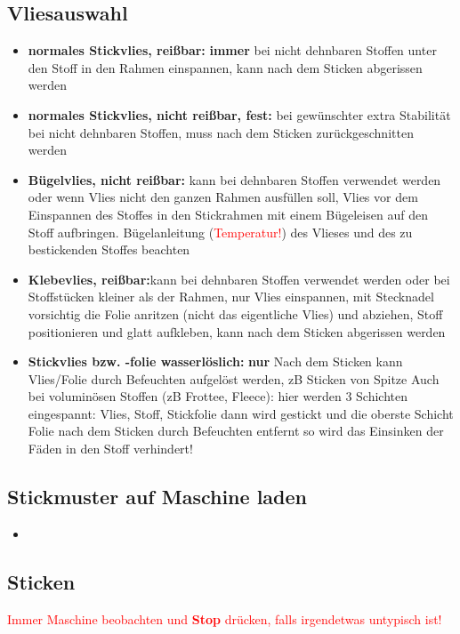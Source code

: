 \documentclass{\basedir/fablab-document}
\begin{document}
\subsection{Vliesauswahl}
\begin{itemize}
	\item \textbf{normales Stickvlies, reißbar:} \textbf{immer} bei nicht dehnbaren Stoffen unter den Stoff in den Rahmen einspannen, kann nach dem Sticken abgerissen werden
	\item \textbf{normales Stickvlies, nicht reißbar, fest:} bei gewünschter extra Stabilität bei nicht dehnbaren Stoffen, muss nach dem Sticken zurückgeschnitten werden
	\item \textbf{Bügelvlies, nicht reißbar:} kann bei dehnbaren Stoffen verwendet werden oder wenn Vlies nicht den ganzen Rahmen ausfüllen soll, Vlies vor dem Einspannen des Stoffes in den Stickrahmen mit einem Bügeleisen auf den Stoff aufbringen. Bügelanleitung (\textcolor{red}{Temperatur!}) des Vlieses und des zu bestickenden Stoffes beachten  
	\item \textbf{Klebevlies, reißbar:}kann bei dehnbaren Stoffen verwendet werden oder bei Stoffstücken kleiner als der Rahmen, nur Vlies einspannen, mit Stecknadel vorsichtig die Folie anritzen (nicht das eigentliche Vlies) und abziehen, Stoff positionieren und glatt aufkleben, kann nach dem Sticken abgerissen werden
	\item \textbf{Stickvlies bzw. -folie wasserlöslich:} \textbf{nur} Nach dem Sticken kann Vlies/Folie durch Befeuchten aufgelöst werden, zB Sticken von Spitze
	Auch bei voluminösen Stoffen (zB Frottee, Fleece): hier werden 3 Schichten eingespannt: Vlies, Stoff, Stickfolie dann wird gestickt und die oberste Schicht Folie nach dem Sticken durch Befeuchten entfernt
so wird das Einsinken der Fäden in den Stoff verhindert!
\end{itemize}

\subsection{Stickmuster auf Maschine laden}
\begin{itemize}
	\item
\end{itemize}

\subsection{Sticken}
\textcolor{red}{Immer Maschine beobachten und \textbf{Stop} drücken, falls irgendetwas untypisch ist!}
\end{document}
